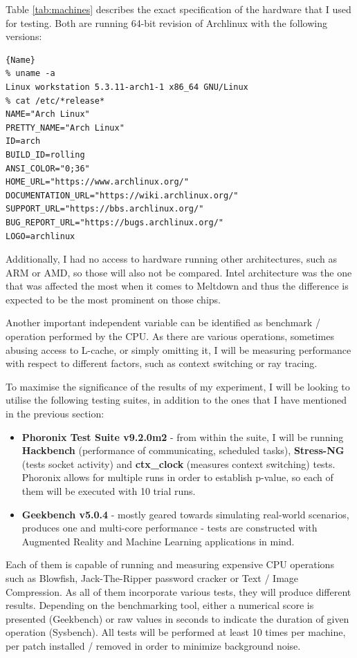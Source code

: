 \documentclass{csfourzero}
\begin{document}
Table \ref{tab:machines} describes the exact specification of the hardware that I used for testing. Both are running 64-bit revision of Archlinux with the following versions: 

\begin{lstlisting}[frame=tlrb, basicstyle=\small]{Name}
% uname -a
Linux workstation 5.3.11-arch1-1 x86_64 GNU/Linux
% cat /etc/*release*
NAME="Arch Linux"
PRETTY_NAME="Arch Linux"
ID=arch
BUILD_ID=rolling
ANSI_COLOR="0;36"
HOME_URL="https://www.archlinux.org/"
DOCUMENTATION_URL="https://wiki.archlinux.org/"
SUPPORT_URL="https://bbs.archlinux.org/"
BUG_REPORT_URL="https://bugs.archlinux.org/"
LOGO=archlinux
\end{lstlisting}

Additionally, I had no access to hardware running other architectures, such as ARM or AMD, so those will also not be compared. Intel architecture was the one that was affected the most when it comes to Meltdown and thus the difference is expected to be the most prominent on those chips.

Another important independent variable can be identified as benchmark / operation performed by the CPU. As there are various operations, sometimes abusing access to L-cache, or simply omitting it, I will be measuring performance with respect to different factors, such as context switching or ray tracing.

To maximise the significance of the results of my experiment, I will be looking to utilise the following testing suites, in addition to the ones that I have mentioned in the previous section:
\begin{itemize}
  \item \textbf{Phoronix Test Suite v9.2.0m2} - from within the suite, I will be running \textbf{Hackbench} (performance of communicating, scheduled tasks), \textbf{Stress-NG} (tests socket activity) and \textbf{ctx\_clock} (measures context switching) tests. Phoronix allows for multiple runs in order to establish p-value, so each of them will be executed with 10 trial runs.
  \item \textbf{Geekbench v5.0.4} - mostly geared towards simulating real-world scenarios, produces one and multi-core performance - tests are constructed with Augmented Reality and Machine Learning applications in mind. \cite{geekbench}
\end{itemize}
Each of them is capable of running and measuring expensive CPU operations such as Blowfish, Jack-The-Ripper password cracker or Text / Image Compression. As all of them incorporate various tests, they will produce different results. Depending on the benchmarking tool, either a numerical score is presented (Geekbench) or raw values in seconds to indicate the duration of given operation (Sysbench). All tests will be performed at least 10 times per machine, per patch installed / removed in order to minimize background noise. 
\end{document}
